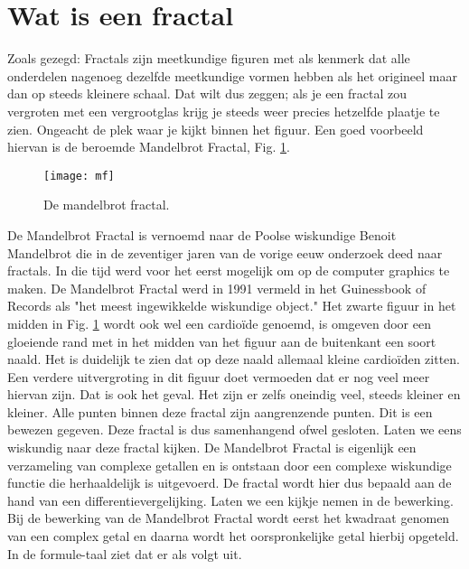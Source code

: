 \documentclass[11pt,fleqn]{book} %
\begin{document}
\section{Wat is een fractal}
Zoals gezegd: Fractals zijn meetkundige figuren met als kenmerk dat alle onderdelen nagenoeg dezelfde meetkundige vormen hebben als het origineel maar dan op steeds kleinere schaal. Dat wilt dus zeggen; als je een fractal zou vergroten met een vergrootglas krijg je steeds weer precies hetzelfde plaatje te zien. Ongeacht de plek waar je kijkt binnen het figuur. Een goed voorbeeld hiervan is de beroemde Mandelbrot Fractal, Fig. \ref{fig:mf}.
\begin{figure}[h]
	\centering\texttt{[image: mf]}
	\caption{De mandelbrot fractal.}
	\label{fig:mf}
\end{figure}
De Mandelbrot Fractal is vernoemd naar de Poolse wiskundige Benoit Mandelbrot die in de zeventiger jaren van de vorige eeuw onderzoek deed naar fractals. In die tijd werd voor het eerst mogelijk om op de computer graphics te maken. De Mandelbrot Fractal werd in 1991 vermeld in het Guinessbook of Records als "het meest ingewikkelde wiskundige object." 
Het zwarte figuur in het midden in Fig. \ref{fig:mf} wordt ook wel een cardioïde genoemd, is omgeven door een gloeiende rand met in het midden van het figuur aan de buitenkant een soort naald. Het is duidelijk te zien dat op deze naald allemaal kleine cardioïden zitten. Een verdere uitvergroting in dit figuur doet vermoeden dat er nog veel meer hiervan zijn. Dat is ook het geval. Het zijn er zelfs oneindig veel, steeds kleiner en kleiner. Alle punten binnen deze fractal zijn aangrenzende punten. Dit is een bewezen gegeven. Deze fractal is dus samenhangend ofwel gesloten. 
Laten we eens wiskundig naar deze fractal kijken. De Mandelbrot Fractal is eigenlijk een verzameling van complexe getallen en is ontstaan door een complexe wiskundige functie die herhaaldelijk is uitgevoerd. De fractal wordt hier dus bepaald aan de hand van een differentievergelijking. Laten we een kijkje nemen in de bewerking.
Bij de bewerking van de Mandelbrot Fractal wordt eerst het kwadraat genomen van een complex getal en daarna wordt het oorspronkelijke getal hierbij opgeteld. In de formule-taal ziet dat er als volgt uit.




\end{document}
